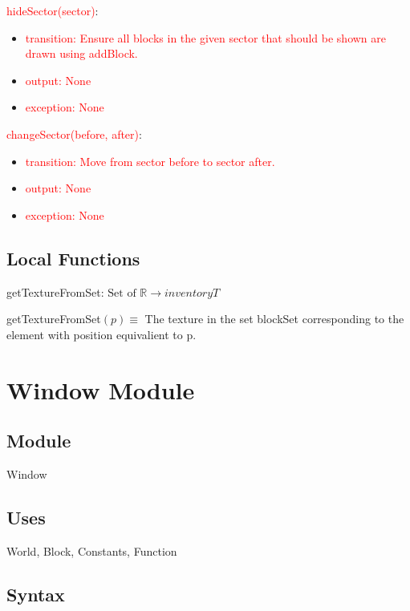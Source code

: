 \documentclass[12pt]{article}
\begin{document}
\noindent \textcolor{red}{hideSector(sector)}:
\begin{itemize}
\item \textcolor{red}{transition: Ensure all blocks in the given sector that should be shown are drawn using addBlock.}
\item \textcolor{red}{output: None} 
\item \textcolor{red}{exception: None}\\
\end{itemize}

\noindent \textcolor{red}{changeSector(before, after)}:
\begin{itemize}
\item \textcolor{red}{transition:  Move from sector before to sector after.}
\item \textcolor{red}{output: None} 
\item \textcolor{red}{exception: None}\\
\end{itemize}



\subsection*{Local Functions}

getTextureFromSet: $ \mbox{Set of } \mathbb{R} \rightarrow inventoryT$

\noindent getTextureFromSet$(p) \equiv$
\medskip
The texture in the set blockSet corresponding to the element with position equivalient to p.\\
\medskip
\newpage

\section* {Window Module}

\subsection*{Module}

Window

\subsection* {Uses}

World, Block, Constants, Function

\subsection* {Syntax}
\end{document}
